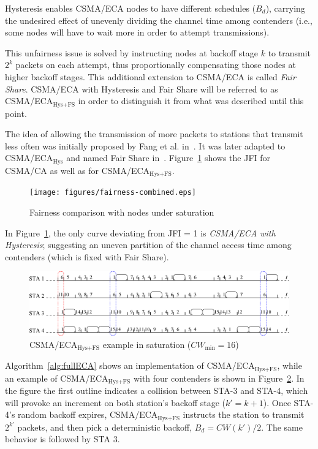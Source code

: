 \documentclass[a4paper,journal]{IEEEtran}
\begin{document}
	Hysteresis enables CSMA/ECA nodes to have different schedules ($B_{d}$), carrying the undesired effect of unevenly dividing the channel time among contenders (i.e., some nodes will have to wait more in order to attempt transmissions).
	
	This unfairness issue is solved by instructing nodes at backoff stage $k$ to transmit $2^{k}$ packets on each attempt, thus proportionally compensating those nodes at higher backoff stages. This additional extension to CSMA/ECA is called \emph{Fair Share}. CSMA/ECA with Hysteresis and Fair Share will be referred to as CSMA/ECA$_{\text{Hys+FS}}$ in order to distinguish it from what was described until this point.
	
	The idea of allowing the transmission of more packets to stations that transmit less often was initially proposed by Fang et al. in~\cite{L_MAC}. It was later adapted to CSMA/ECA$_{\text{Hys}}$ and named Fair Share in~\cite{research2standards}. Figure~\ref{fig:fairness} shows the JFI for CSMA/CA as well as for CSMA/ECA$_{\text{Hys+FS}}$.
	
	\begin{figure}[tb]
	\centering
		\texttt{[image: figures/fairness-combined.eps]}
		\caption{Fairness comparison with nodes under saturation}
		\label{fig:fairness}
	\end{figure}
	
	In Figure~\ref{fig:fairness}, the only curve deviating from JFI = 1 is \emph{CSMA/ECA with Hysteresis}; suggesting an uneven partition of the channel access time among contenders (which is fixed with Fair Share).
	
	\begin{figure}[tb]
	\centering
		\includegraphics[width=0.8\linewidth]{figures/csma_eca_different_backoff_short.eps}
		\caption{CSMA/ECA$_{\text{Hys+FS}}$ example in saturation ($CW_{\min}=16$)}
		\label{fig:ECA+Hyst}
	\end{figure}
	
	Algorithm~\ref{alg:fullECA} shows an implementation of CSMA/ECA$_{\text{Hys+FS}}$, while an example of CSMA/ECA$_{\text{Hys+FS}}$ with four contenders is shown in  Figure~\ref{fig:ECA+Hyst}. In the figure the first outline indicates a collision between STA-3 and STA-4, which will provoke an increment on both station's backoff stage ($k'=k+1$). Once STA-4's random backoff expires, CSMA/ECA$_{\text{Hys+FS}}$ instructs the station to transmit $2^{k'}$ packets, and then pick a deterministic backoff, $B_{d}=CW(k')/2$. The same behavior is followed by STA 3.
	
\end{document}
